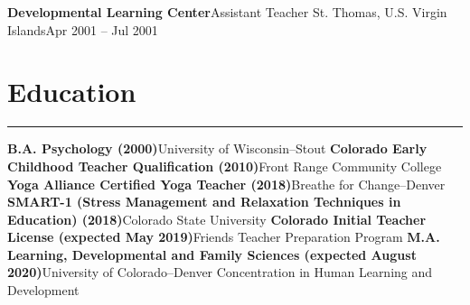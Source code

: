 \documentclass[letterpaper,10pt]{article}
\newcommand{\mblue}{\color{darkblue}}
\begin{document}
\vspace{1pc}
\textbf{Developmental Learning Center}\hfill Assistant Teacher
\smallbreak St. Thomas, U.S. Virgin Islands\hfill Apr 2001 -- Jul 2001


\section*{\mblue Education}

\vspace{-2.15pc}
{\hfill\mblue\rule{5.845in}{0.02cm}}

\vspace{1pc}
\textbf{B.A. Psychology (2000)}\hfill University of Wisconsin--Stout
\bigbreak\textbf{Colorado Early Childhood Teacher Qualification (2010)}\hfill Front Range Community College
\bigbreak\textbf{Yoga Alliance Certified Yoga Teacher (2018)}\hfill Breathe for Change--Denver
\bigbreak\textbf{SMART-1 (Stress Management and Relaxation Techniques in Education) (2018)}\hfill Colorado State University
\bigbreak\textbf{Colorado Initial Teacher License (expected May 2019)}\hfill Friends Teacher Preparation Program
\bigbreak\textbf{M.A. Learning, Developmental and Family Sciences (expected August 2020)}\hfill University of Colorado--Denver
\smallbreak Concentration in Human Learning and Development
\end{document}
